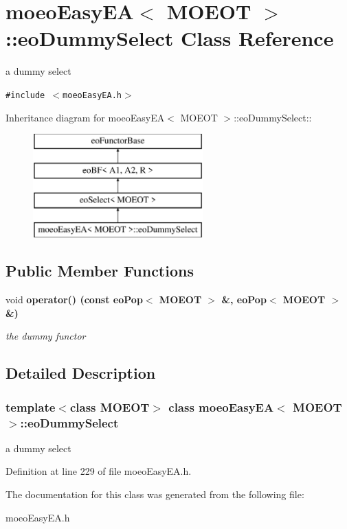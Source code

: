 \section{moeo\-Easy\-EA$<$ MOEOT $>$::eo\-Dummy\-Select Class Reference}
\label{classmoeoEasyEA_1_1eoDummySelect}
a dummy select  


{\tt \#include $<$moeo\-Easy\-EA.h$>$}

Inheritance diagram for moeo\-Easy\-EA$<$ MOEOT $>$::eo\-Dummy\-Select::\begin{figure}[H]
\begin{center}
\leavevmode
\includegraphics[height=4cm]{classmoeoEasyEA_1_1eoDummySelect}
\end{center}
\end{figure}
\subsection*{Public Member Functions}
\begin{CompactItemize}
\item 
void \bf{operator()} (const \bf{eo\-Pop}$<$ MOEOT $>$ \&, \bf{eo\-Pop}$<$ MOEOT $>$ \&)\label{classmoeoEasyEA_1_1eoDummySelect_32207d2ed997aa90ba9f32f5625b63d6}

\begin{CompactList}\small\item\em the dummy functor \item\end{CompactList}\end{CompactItemize}


\subsection{Detailed Description}
\subsubsection*{template$<$class MOEOT$>$ class moeo\-Easy\-EA$<$ MOEOT $>$::eo\-Dummy\-Select}

a dummy select 



Definition at line 229 of file moeo\-Easy\-EA.h.

The documentation for this class was generated from the following file:\begin{CompactItemize}
\item 
moeo\-Easy\-EA.h\end{CompactItemize}
